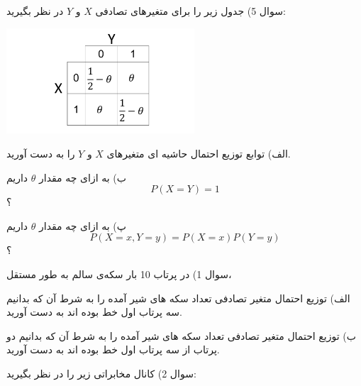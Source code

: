 \documentclass[10pt,letterpaper]{report}
\begin{document}
سوال 5) جدول زیر را برای متغیرهای تصادفی $X$ و $Y$ در نظر بگیرید:
\begin{center}
\includegraphics[width=70mm]{XY_CDF}
\end{center}
الف) توابع توزیع احتمال حاشیه ای متغیرهای $X$ و $Y$ را به دست آورید.

ب) به ازای چه مقدار $\theta$ داریم
$$
P(X=Y)=1
$$
؟

پ) به ازای چه مقدار $\theta$ داریم
$$
P(X=x,Y=y)=P(X=x)P(Y=y)
$$
؟

%
%
%
سوال 1) در پرتاب 10 بار سکه‌ی سالم به طور مستقل،

الف) توزیع احتمال متغیر تصادفی تعداد سکه های شیر آمده را به شرط آن که بدانیم سه پرتاب اول خط بوده اند به دست آورید.

ب) توزیع احتمال متغیر تصادفی تعداد سکه های شیر آمده را به شرط آن که بدانیم دو پرتاب از سه پرتاب اول خط بوده اند به دست آورید.

سوال 2) کانال مخابراتی زیر را در نظر بگیرید:
\end{document}
